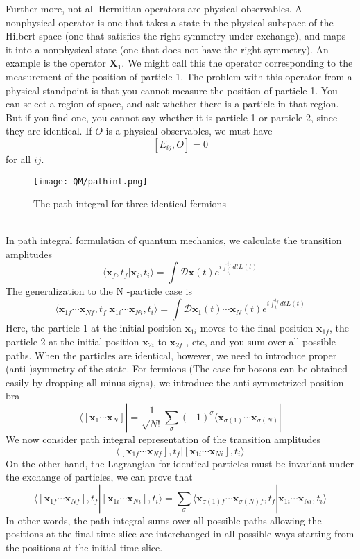 Further more, not all Hermitian operators are physical observables. A nonphysical operator is one that takes a state
in the physical subspace of the Hilbert space (one that satisfies the right symmetry under exchange), and maps it into a nonphysical state (one that does not have the right symmetry).
An example is the operator $\bm{X}_1$. We might call this the operator corresponding to the measurement of the position of
particle 1. 
The problem with this operator from a physical standpoint is that you cannot measure the position of particle 1. You can select a region of space, and ask whether there is a particle in that region. But if you find one, you cannot say whether it is particle 1 or particle 2, since they are identical. 
If $O$ is a physical observables, we must have
\[[E_{ij},O] = 0\]
for all $ij$.
\begin{figure}[!h]
	\centering
	\texttt{[image: QM/pathint.png]}
	\caption{The path integral for three identical fermions}
\end{figure}\\
In path integral formulation of quantum mechanics, we calculate the transition amplitudes
\[\langle \bm{x}_f,t_f | \bm{x}_i,t_i\rangle = \int \mathcal{D}\bm{x}(t) e^{i\int_{t_i}^{t_f} dt L(t)}\]
The generalization to the N -particle case is
\[\langle \bm{x}_{1f}\cdots\bm{x}_{Nf},t_f | \bm{x}_{1i}\cdots\bm{x}_{Ni},t_i\rangle = \int \mathcal{D}\bm{x}_1(t)\cdots\bm{x}_N(t) e^{i\int_{t_i}^{t_f} dt L(t)}\]
Here, the particle 1 at the initial position $\bm{x}_{1i}$ moves to the final position $\bm{x}_{1f}$, the particle 2 at the initial position $\bm{x}_{2i}$ to $\bm{x}_{2f}$ , etc, and you sum over all possible paths.
When the particles are identical, however, we need to introduce proper (anti-)symmetry of the state. For fermions (The case for bosons can be obtained easily by dropping all minus signs), we introduce the anti-symmetrized position bra
\[\langle [\bm{x}_1\cdots\bm{x}_N]| = \frac{1}{\sqrt{N!}} \sum_{\sigma} (-1)^{\sigma} \langle \bm{x}_{\sigma(1)}\cdots\bm{x}_{\sigma(N)}|\]
We now consider path integral representation of the transition amplitudes
\[\langle [\bm{x}_{1f}\cdots\bm{x}_{Nf}],t_f | [\bm{x}_{1i}\cdots\bm{x}_{Ni}],t_i\rangle\]
On the other hand, the Lagrangian for identical particles must be invariant under the exchange of particles, we can prove that
\[\langle [\bm{x}_{1f}\cdots\bm{x}_{Nf}],t_f | [\bm{x}_{1i}\cdots\bm{x}_{Ni}],t_i\rangle = \sum_{\sigma} \langle \bm{x}_{\sigma(1)f}\cdots\bm{x}_{\sigma(N)f},t_f | \bm{x}_{1i}\cdots\bm{x}_{Ni},t_i\rangle\]
In other words, the path integral sums over all possible paths allowing the positions at the final time slice are interchanged in all possible ways starting from the positions at the initial time slice.

